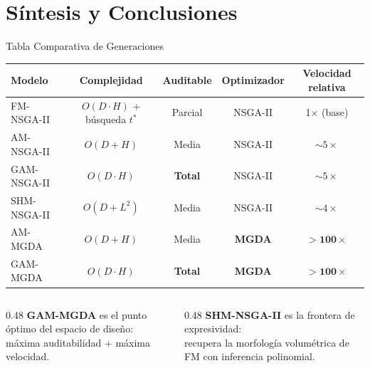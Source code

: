 \documentclass[aspectratio=169,10pt]{beamer}
\begin{document}
\section{Síntesis y Conclusiones}

\begin{frame}{Tabla Comparativa de Generaciones}
  \centering
  {\small
  \begin{tabular}{lcccc}
    \toprule
    \textbf{Modelo} & \textbf{Complejidad} & \textbf{Auditable} & \textbf{Optimizador} & \textbf{Velocidad relativa}\\
    \midrule
    FM-NSGA-II  & $O(D \cdot H)$ + búsqueda $t^*$ & Parcial & NSGA-II & 1$\times$ (base) \\
    AM-NSGA-II  & $O(D + H)$                       & Media   & NSGA-II & $\sim 5\times$ \\
    GAM-NSGA-II & $O(D \cdot H)$                   & \textcolor{accent3}{\textbf{Total}} & NSGA-II & $\sim 5\times$ \\
    SHM-NSGA-II & $O(D + L^2)$                     & Media   & NSGA-II & $\sim 4\times$ \\
    AM-MGDA     & $O(D + H)$                        & Media   & \textcolor{accent3}{\textbf{MGDA}}   & $\mathbf{>100\times}$ \\
    GAM-MGDA    & $O(D \cdot H)$                   & \textcolor{accent3}{\textbf{Total}} & \textcolor{accent3}{\textbf{MGDA}}   & $\mathbf{>100\times}$ \\
    \bottomrule
  \end{tabular}}
  \vspace{8pt}
  \begin{columns}
    \begin{column}{0.48\textwidth}
      \textbf{GAM-MGDA} es el punto óptimo del espacio de diseño:\\
      máxima auditabilidad + máxima velocidad.
    \end{column}
    \begin{column}{0.48\textwidth}
      \textbf{SHM-NSGA-II} es la frontera de expresividad:\\
      recupera la morfología volumétrica de FM con inferencia polinomial.
    \end{column}
  \end{columns}
\end{frame}
\end{document}
